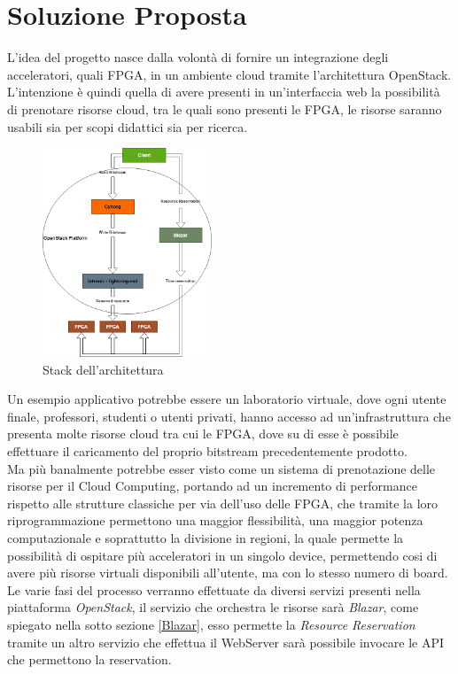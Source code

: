 \chapter{Soluzione Proposta}
\label{chap:Cap1}
L'idea del progetto nasce dalla volontà di fornire un integrazione degli acceleratori, quali FPGA, in un ambiente cloud tramite l'architettura OpenStack. L'intenzione è quindi quella di avere presenti in un'interfaccia web la possibilità di prenotare risorse cloud, tra le quali sono presenti le FPGA, le risorse saranno usabili sia per scopi didattici sia per ricerca.
\begin{figure}[h]
\centering
\includegraphics[width=0.45\textwidth]{images/Stack1.png}
\caption{Stack dell'architettura}
\end{figure}\clearpage
Un esempio applicativo potrebbe essere un laboratorio virtuale, dove ogni utente finale, professori, studenti o utenti privati, hanno accesso ad un'infrastruttura che presenta molte risorse cloud tra cui le FPGA, dove su di esse è possibile effettuare il caricamento del proprio bitstream precedentemente prodotto.\\
Ma più banalmente potrebbe esser visto come un sistema di prenotazione delle risorse per il Cloud Computing, portando ad un incremento di performance rispetto alle strutture classiche per via dell'uso delle FPGA, che tramite la loro riprogrammazione permettono una maggior flessibilità, una maggior potenza computazionale e soprattutto la divisione in regioni, la quale permette la possibilità di ospitare più acceleratori in un singolo device, permettendo cosi di avere più risorse virtuali disponibili all'utente, ma con lo stesso numero di board.\\
Le varie fasi del processo verranno effettuate da diversi servizi presenti nella piattaforma \textit{OpenStack}, il servizio che orchestra le risorse sarà \textit{Blazar}, come spiegato nella sotto sezione \ref{Blazar}, esso permette la \textit{Resource Reservation} tramite un altro servizio che effettua il WebServer sarà possibile invocare le API che permettono la reservation.

